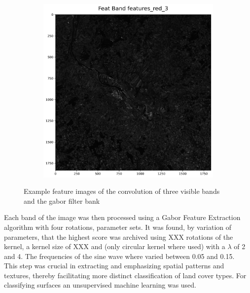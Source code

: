 \documentclass[12pt,a4paper, english]{article}
\begin{document}
\begin{figure}[!htbp]
\begin{subfigure}[b]{0.3\textwidth}
      \end{subfigure}
      \begin{subfigure}[b]{0.3\textwidth}
        \includegraphics[width=\textwidth]{img/Features_red2.png}
      \end{subfigure}
     \caption{Example feature images of the convolution of three visible bands and the gabor filter bank\label{fig:gaborresults}}
    \end{figure}
  
      Each band of the image was then processed using a Gabor Feature Extraction algorithm with four rotations, parameter sets. 
      It was found, by variation of parameters, that the highest score was archived using XXX 
      rotations of the kernel, a kernel size of XXX
      and (only circular kernel where used) with a $\lambda$ of 2 and 4. %
      The frequencies of the sine wave where varied between 0.05 and 0.15. \\ 
      This step was crucial in extracting and emphasizing spatial patterns and textures, thereby facilitating more distinct classification of land cover types. %
      For classifying surfaces an unsupervised machine learning was used. 
\end{document}
